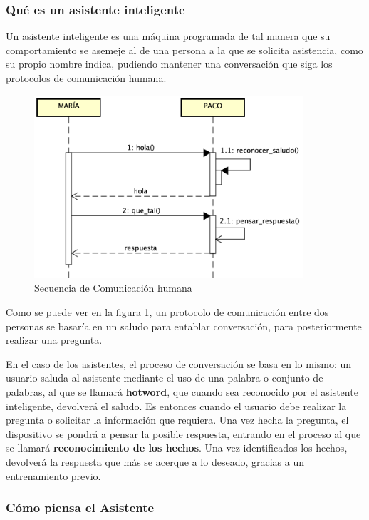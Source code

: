 \subsubsection{Qué es un asistente inteligente}

Un asistente inteligente es una máquina programada de tal manera que su comportamiento se asemeje al de una persona a la que se solicita asistencia, como su propio nombre indica, pudiendo mantener una conversación que siga los protocolos de comunicación humana.

\begin{figure}[h!]
    \centering
    \includegraphics[width=10cm]{./img/sequence/human.png}
    \caption{Secuencia de Comunicación humana}
    \label{fig:humanseq}
\end{figure}

Como se puede ver en la figura \ref{fig:humanseq}, un protocolo de comunicación entre dos personas se basaría en un saludo para entablar conversación, para posteriormente realizar una pregunta.

En el caso de los asistentes, el proceso de conversación se basa en lo mismo: un usuario saluda al asistente mediante el uso de una palabra o conjunto de palabras, al que se llamará \textbf{hotword}, que cuando sea reconocido por el asistente inteligente, devolverá el saludo.
Es entonces cuando el usuario debe realizar la pregunta o solicitar la información que requiera.
Una vez hecha la pregunta, el dispositivo se pondrá a pensar la posible respuesta, entrando en el proceso al que se llamará \textbf{reconocimiento de los hechos}. Una vez identificados los hechos, devolverá la respuesta que más se acerque a lo deseado, gracias a un entrenamiento previo.

\subsubsection{Cómo piensa el Asistente}

